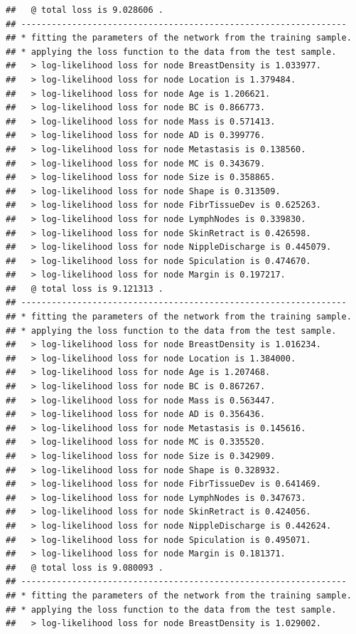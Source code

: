 \documentclass[]{article}
\begin{document}
\begin{verbatim}
##   @ total loss is 9.028606 .
## ----------------------------------------------------------------
## * fitting the parameters of the network from the training sample.
## * applying the loss function to the data from the test sample.
##   > log-likelihood loss for node BreastDensity is 1.033977.
##   > log-likelihood loss for node Location is 1.379484.
##   > log-likelihood loss for node Age is 1.206621.
##   > log-likelihood loss for node BC is 0.866773.
##   > log-likelihood loss for node Mass is 0.571413.
##   > log-likelihood loss for node AD is 0.399776.
##   > log-likelihood loss for node Metastasis is 0.138560.
##   > log-likelihood loss for node MC is 0.343679.
##   > log-likelihood loss for node Size is 0.358865.
##   > log-likelihood loss for node Shape is 0.313509.
##   > log-likelihood loss for node FibrTissueDev is 0.625263.
##   > log-likelihood loss for node LymphNodes is 0.339830.
##   > log-likelihood loss for node SkinRetract is 0.426598.
##   > log-likelihood loss for node NippleDischarge is 0.445079.
##   > log-likelihood loss for node Spiculation is 0.474670.
##   > log-likelihood loss for node Margin is 0.197217.
##   @ total loss is 9.121313 .
## ----------------------------------------------------------------
## * fitting the parameters of the network from the training sample.
## * applying the loss function to the data from the test sample.
##   > log-likelihood loss for node BreastDensity is 1.016234.
##   > log-likelihood loss for node Location is 1.384000.
##   > log-likelihood loss for node Age is 1.207468.
##   > log-likelihood loss for node BC is 0.867267.
##   > log-likelihood loss for node Mass is 0.563447.
##   > log-likelihood loss for node AD is 0.356436.
##   > log-likelihood loss for node Metastasis is 0.145616.
##   > log-likelihood loss for node MC is 0.335520.
##   > log-likelihood loss for node Size is 0.342909.
##   > log-likelihood loss for node Shape is 0.328932.
##   > log-likelihood loss for node FibrTissueDev is 0.641469.
##   > log-likelihood loss for node LymphNodes is 0.347673.
##   > log-likelihood loss for node SkinRetract is 0.424056.
##   > log-likelihood loss for node NippleDischarge is 0.442624.
##   > log-likelihood loss for node Spiculation is 0.495071.
##   > log-likelihood loss for node Margin is 0.181371.
##   @ total loss is 9.080093 .
## ----------------------------------------------------------------
## * fitting the parameters of the network from the training sample.
## * applying the loss function to the data from the test sample.
##   > log-likelihood loss for node BreastDensity is 1.029002.

\end{verbatim}
\end{document}
